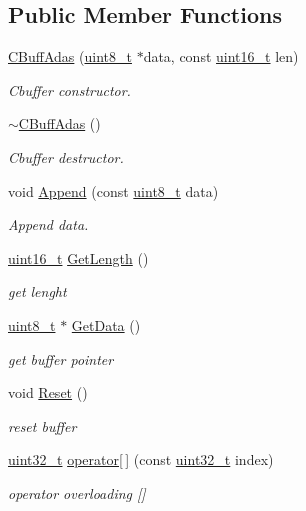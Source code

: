 \subsection*{Public Member Functions}
\begin{DoxyCompactItemize}
\item 
\mbox{\hyperlink{class_c_buff_adas_a7491e123b003457b2565435ae7ac9ce4}{C\+Buff\+Adas}} (\mbox{\hyperlink{_a_d_a_s___types_8h_aba7bc1797add20fe3efdf37ced1182c5}{uint8\+\_\+t}} $\ast$data, const \mbox{\hyperlink{_a_d_a_s___types_8h_a1f1825b69244eb3ad2c7165ddc99c956}{uint16\+\_\+t}} len)
\begin{DoxyCompactList}\small\item\em Cbuffer constructor. \end{DoxyCompactList}\item 
\mbox{\hyperlink{class_c_buff_adas_a55af513577ba8522492fff4db85da247}{$\sim$\+C\+Buff\+Adas}} ()
\begin{DoxyCompactList}\small\item\em Cbuffer destructor. \end{DoxyCompactList}\item 
void \mbox{\hyperlink{class_c_buff_adas_aceac4b71872e406861286959f578c89b}{Append}} (const \mbox{\hyperlink{_a_d_a_s___types_8h_aba7bc1797add20fe3efdf37ced1182c5}{uint8\+\_\+t}} data)
\begin{DoxyCompactList}\small\item\em Append data. \end{DoxyCompactList}\item 
\mbox{\hyperlink{_a_d_a_s___types_8h_a1f1825b69244eb3ad2c7165ddc99c956}{uint16\+\_\+t}} \mbox{\hyperlink{class_c_buff_adas_a493f61488df8ac9f7e942af1a2fbdbf3}{Get\+Length}} ()
\begin{DoxyCompactList}\small\item\em get lenght \end{DoxyCompactList}\item 
\mbox{\hyperlink{_a_d_a_s___types_8h_aba7bc1797add20fe3efdf37ced1182c5}{uint8\+\_\+t}} $\ast$ \mbox{\hyperlink{class_c_buff_adas_a56fdcdc9766874d3a6fef04119ee91f9}{Get\+Data}} ()
\begin{DoxyCompactList}\small\item\em get buffer pointer \end{DoxyCompactList}\item 
void \mbox{\hyperlink{class_c_buff_adas_a2ff1ee5f1dfa56117d76b17027d7b7e8}{Reset}} ()
\begin{DoxyCompactList}\small\item\em reset buffer \end{DoxyCompactList}\item 
\mbox{\hyperlink{_a_d_a_s___types_8h_a06896e8c53f721507066c079052171f8}{uint32\+\_\+t}} \mbox{\hyperlink{class_c_buff_adas_ae1a6aa5f049b0e1e04950af1c55df3d7}{operator\mbox{[}$\,$\mbox{]}}} (const \mbox{\hyperlink{_a_d_a_s___types_8h_a06896e8c53f721507066c079052171f8}{uint32\+\_\+t}} index)
\begin{DoxyCompactList}\small\item\em operator overloading \mbox{[}\mbox{]} \end{DoxyCompactList}\end{DoxyCompactItemize}


